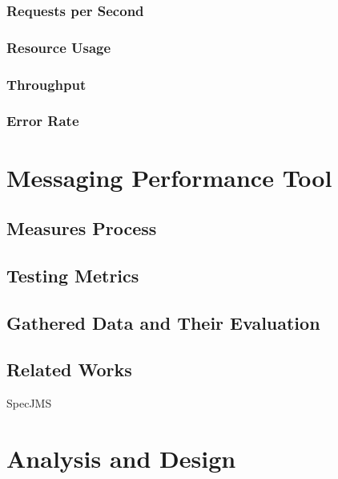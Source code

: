 \subsection{Requests per Second}

\subsection{Resource Usage}

\subsection{Throughput}

\subsection{Error Rate}

\chapter{Messaging Performance Tool}
\label{Messaging Performance Tool}

\section{Measures Process}
\label{Measures Process}

\section{Testing Metrics}
\label{Testing Metrics}

\section{Gathered Data and Their Evaluation}
\label{Gathered Data and Their Evaluation}

\section{Related Works}
\label{Related Works}

SpecJMS

\chapter{Analysis and Design}
\label{Analysis and Design}


